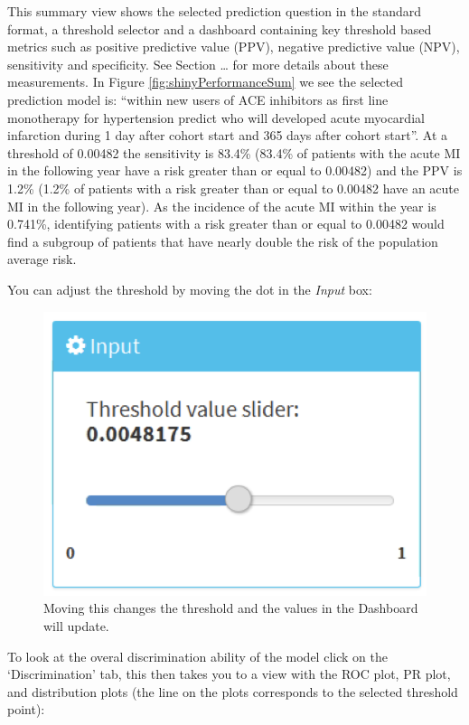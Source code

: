 \documentclass[11pt]{book}
\begin{document}
This summary view shows the selected prediction question in the standard
format, a threshold selector and a dashboard containing key threshold
based metrics such as positive predictive value (PPV), negative
predictive value (NPV), sensitivity and specificity. See Section
\ldots{} for more details about these measurements. In Figure
\ref{fig:shinyPerformanceSum} we see the selected prediction model is:
``within new users of ACE inhibitors as first line monotherapy for
hypertension predict who will developed acute myocardial infarction
during 1 day after cohort start and 365 days after cohort start''. At a
threshold of 0.00482 the sensitivity is 83.4\% (83.4\% of patients with
the acute MI in the following year have a risk greater than or equal to
0.00482) and the PPV is 1.2\% (1.2\% of patients with a risk greater
than or equal to 0.00482 have an acute MI in the following year). As the
incidence of the acute MI within the year is 0.741\%, identifying
patients with a risk greater than or equal to 0.00482 would find a
subgroup of patients that have nearly double the risk of the population
average risk.

You can adjust the threshold by moving the dot in the \emph{Input} box:

\begin{figure}

{\centering \includegraphics[width=0.8\linewidth]{images/PatientLevelPrediction/shiny/shinyPerformanceThres} 

}

\caption{Moving this changes the threshold and the values in the Dashboard will update.}\label{fig:shinyPerformanceThres}
\end{figure}

To look at the overal discrimination ability of the model click on the
`Discrimination' tab, this then takes you to a view with the ROC plot,
PR plot, and distribution plots (the line on the plots corresponds to
the selected threshold point):
\end{document}
